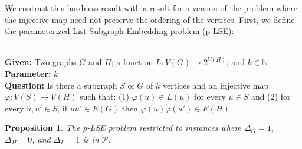 \documentclass[11pt]{article}
\newtheorem{proposition}[theorem]{Proposition}
\newcommand{\paramproblem}[4]{\noindent {\sc #1}
\\
{\bf Given:} #2\\
{\bf Parameter:} #3\\
{\bf Question:} #4}
\newcommand{\nat}{\mathbb{N}}
\newcommand{\Pol}{\mbox{$\mathcal P$}}
\let\phi=\varphi
\begin{document}
We contrast this hardness result with a result for a version of the problem where the injective map need not preserve the ordering of the vertices.  First, we define the parameterized {\sc List Subgraph Embedding} problem (p-LSE):

\paramproblem{} {Two graphs $G$ and $H$; a function $L : V(G) \longrightarrow 2^{V(H)}$; and $k \in \nat$}{$k$}{Is there a subgraph $S$ of $G$ of $k$ vertices and an injective map $\phi: V(S) \longrightarrow V(H)$ such that: (1) $\phi(u) \in L(u)$ for every $u \in S$ and (2) for every $u, u' \in S$, if $uu' \in E(G)$ then $\phi(u)\phi(u') \in E(H)$} \\

\begin{proposition}\label{prop:pLSE-in-P}
The p-LSE problem restricted to instances where $\Delta_G=1$, $\Delta_H=0$, and $\Delta_L=1$ is in $\Pol$.
\end{proposition}
\end{document}

